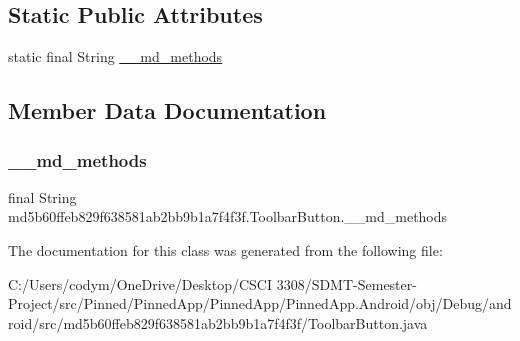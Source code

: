 \subsection*{Static Public Attributes}
\begin{DoxyCompactItemize}
\item 
static final String \hyperlink{classmd5b60ffeb829f638581ab2bb9b1a7f4f3f_1_1_toolbar_button_a4b908a9906061cf63121c61f707eb1da}{\+\_\+\+\_\+md\+\_\+methods}
\end{DoxyCompactItemize}


\subsection{Member Data Documentation}
\mbox{\label{classmd5b60ffeb829f638581ab2bb9b1a7f4f3f_1_1_toolbar_button_a4b908a9906061cf63121c61f707eb1da}} 
\subsubsection{\texorpdfstring{\+\_\+\+\_\+md\+\_\+methods}{\_\_md\_methods}}
{\footnotesize\ttfamily final String md5b60ffeb829f638581ab2bb9b1a7f4f3f.\+Toolbar\+Button.\+\_\+\+\_\+md\+\_\+methods\hspace{0.3cm}{\ttfamily [static]}}



The documentation for this class was generated from the following file\+:\begin{DoxyCompactItemize}
\item 
C\+:/\+Users/codym/\+One\+Drive/\+Desktop/\+C\+S\+C\+I 3308/\+S\+D\+M\+T-\/\+Semester-\/\+Project/src/\+Pinned/\+Pinned\+App/\+Pinned\+App/\+Pinned\+App.\+Android/obj/\+Debug/android/src/md5b60ffeb829f638581ab2bb9b1a7f4f3f/Toolbar\+Button.\+java\end{DoxyCompactItemize}
